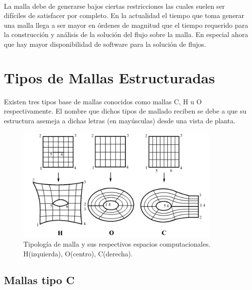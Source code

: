 \documentclass[letterpaper, openright, 12pt]{book}
\begin{document}
    \paragraph*{}
    La malla debe de generarse bajos ciertas restricciones las cuales suelen
    ser difíciles de satisfacer por completo. En la actualidad el tiempo que
    toma generar una malla llega a ser mayor en órdenes de magnitud que el
    tiempo requerido para la construcción y análisis de la solución del
    flujo sobre la malla. En especial ahora que hay mayor disponibilidad de
    software para la solución de flujos.\cite{thompsonhandbook}

\section{Tipos de Mallas Estructuradas}
    \paragraph*{}
    Existen tres tipos base de mallas conocidos como mallas C, H u O
    respectivamente. El nombre que dichos tipos de mallado reciben se debe
    a que su estructura asemeja a dichas letras (en mayúsculas) desde una
    vista de planta.

    \begin{figure}[htbp!]
        \centering
        \includegraphics[keepaspectratio, width=0.9\textwidth]{./img/tipos-de-malla}
        \caption[Tipología de mallas]{Tipología de malla y sus respectivos espacios computacionales. H(izquierda), O(centro), C(derecha).\cite{vladimir-grid}}
        \label{fig:tipos-de-malla}
    \end{figure}

    \subsection{Mallas tipo C}
\end{document}

